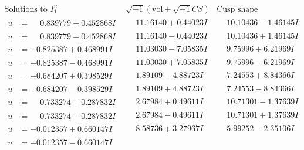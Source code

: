 \documentclass[1p]{elsarticle_modified}
\theoremstyle{definition}
\newcommand{\I}{\sqrt{-1}}
\begin{document}
$$\begin{array}{c|c|c}  
\text{Solutions to }I^u_{1}& \I (\text{vol} + \sqrt{-1}CS) & \text{Cusp shape}\\
 \hline 
\begin{aligned}
u &= \phantom{-}0.839779 + 0.452868 I\end{aligned}
 & \phantom{-}11.16140 + 0.44023 I & \phantom{-}10.10436 - 1.46145 I \\ \hline\begin{aligned}
u &= \phantom{-}0.839779 - 0.452868 I\end{aligned}
 & \phantom{-}11.16140 - 0.44023 I & \phantom{-}10.10436 + 1.46145 I \\ \hline\begin{aligned}
u &= -0.825387 + 0.468991 I\end{aligned}
 & \phantom{-}11.03030 - 7.05835 I & \phantom{-}9.75996 + 6.21969 I \\ \hline\begin{aligned}
u &= -0.825387 - 0.468991 I\end{aligned}
 & \phantom{-}11.03030 + 7.05835 I & \phantom{-}9.75996 - 6.21969 I \\ \hline\begin{aligned}
u &= -0.684207 + 0.398529 I\end{aligned}
 & \phantom{-}1.89109 - 4.88723 I & \phantom{-}7.24553 + 8.84366 I \\ \hline\begin{aligned}
u &= -0.684207 - 0.398529 I\end{aligned}
 & \phantom{-}1.89109 + 4.88723 I & \phantom{-}7.24553 - 8.84366 I \\ \hline\begin{aligned}
u &= \phantom{-}0.733274 + 0.287832 I\end{aligned}
 & \phantom{-}2.67984 + 0.49611 I & \phantom{-}10.71301 - 1.37639 I \\ \hline\begin{aligned}
u &= \phantom{-}0.733274 - 0.287832 I\end{aligned}
 & \phantom{-}2.67984 - 0.49611 I & \phantom{-}10.71301 + 1.37639 I \\ \hline\begin{aligned}
u &= -0.012357 + 0.660147 I\end{aligned}
 & \phantom{-}8.58736 + 3.27967 I & \phantom{-}5.99252 - 2.35106 I \\ \hline\begin{aligned}
u &= -0.012357 - 0.660147 I\end{aligned}

\end{array}$$
\end{document}
